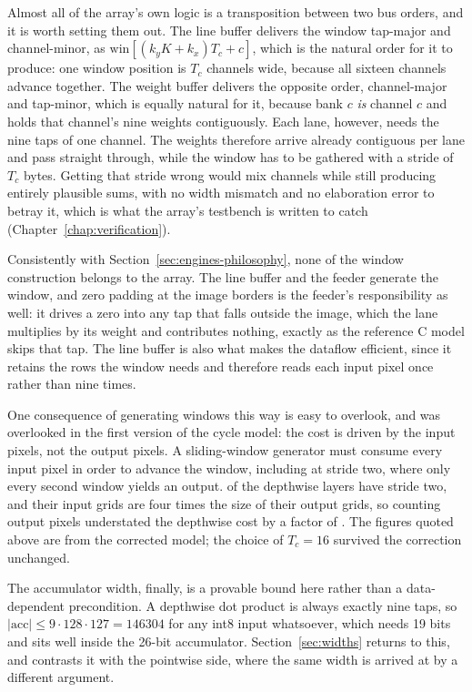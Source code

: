 Almost all of the array's own logic is a transposition between two bus orders,
and it is worth setting them out. The line buffer delivers the window
tap-major and channel-minor, as $\mathrm{win}[(k_y K + k_x) T_c + c]$, which is
the natural order for it to produce: one window position is $T_c$ channels
wide, because all sixteen channels advance together. The weight buffer delivers
the opposite order, channel-major and tap-minor, which is equally natural for
it, because bank $c$ \emph{is} channel $c$ and holds that channel's nine
weights contiguously. Each lane, however, needs the nine taps of one channel.
The weights therefore arrive already contiguous per lane and pass straight
through, while the window has to be gathered with a stride of $T_c$ bytes.
Getting that stride wrong would mix channels while still producing entirely
plausible sums, with no width mismatch and no elaboration error to betray it,
which is what the array's testbench is written to catch
(Chapter~\ref{chap:verification}).

Consistently with Section~\ref{sec:engines-philosophy}, none of the window
construction belongs to the array. The line buffer and the feeder generate the
window, and zero padding at the image borders is the feeder's responsibility
as well: it drives a zero into any tap that falls outside the image, which the
lane multiplies by its weight and contributes nothing, exactly as the
reference C model skips that tap. The line buffer is also what makes the
dataflow efficient, since it retains the rows the window needs and therefore
reads each input pixel once rather than nine times.

One consequence of generating windows this way is easy to overlook, and was
overlooked in the first version of the cycle model: the cost is driven by the
input pixels, not the output pixels. A sliding-window generator must consume
every input pixel in order to advance the window, including at stride two,
where only every second window yields an output. \thDwStrideTwo{} of the
\thDwLayers{} depthwise layers have stride two, and their input grids are four
times the size of their output grids, so counting output pixels understated
the depthwise cost by a factor of \thDwInputFactor{}. The figures quoted above
are from the corrected model; the choice of $T_c = 16$ survived the correction
unchanged.

The accumulator width, finally, is a provable bound here rather than a
data-dependent precondition. A depthwise dot product is always exactly nine
taps, so $\lvert \mathrm{acc} \rvert \le 9 \cdot 128 \cdot 127 = \num{146304}$
for any int8 input whatsoever, which needs 19 bits and sits well inside the
26-bit accumulator. Section~\ref{sec:widths} returns to this, and contrasts it
with the pointwise side, where the same width is arrived at by a different
argument.

